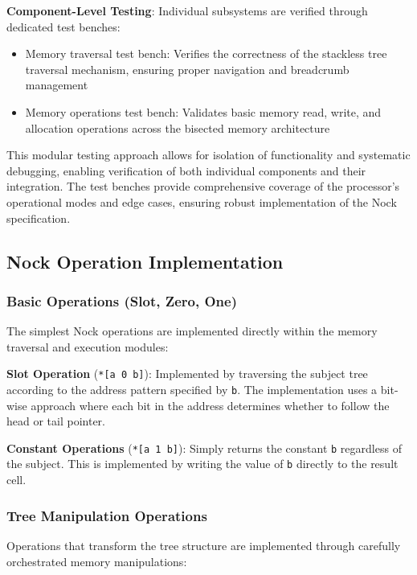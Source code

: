 \documentclass[twoside]{article}
\begin{document}
\textbf{Component-Level Testing}: Individual subsystems are verified through dedicated test benches:
\begin{itemize}
  \item Memory traversal test bench: Verifies the correctness of the stackless tree traversal mechanism, ensuring proper navigation and breadcrumb management
  \item Memory operations test bench: Validates basic memory read, write, and allocation operations across the bisected memory architecture
\end{itemize}

\noindent
This modular testing approach allows for isolation of functionality and systematic debugging, enabling verification of both individual components and their integration. The test benches provide comprehensive coverage of the processor's operational modes and edge cases, ensuring robust implementation of the Nock specification.

\subsection{Nock Operation Implementation}

\subsubsection{Basic Operations (Slot, Zero, One)}

The simplest Nock operations are implemented directly within the memory traversal and execution modules:

\textbf{Slot Operation} (\texttt{*[a 0 b]}): Implemented by traversing the subject tree according to the address pattern specified by \texttt{b}. The implementation uses a bit-wise approach where each bit in the address determines whether to follow the head or tail pointer.

\textbf{Constant Operations} (\texttt{*[a 1 b]}): Simply returns the constant \texttt{b} regardless of the subject. This is implemented by writing the value of \texttt{b} directly to the result cell.

\subsubsection{Tree Manipulation Operations}

Operations that transform the tree structure are implemented through carefully orchestrated memory manipulations:
\end{document}

